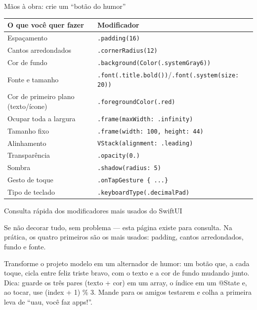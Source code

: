 \begin{tcbpractice}{Mãos à obra: crie um “botão do humor”}

\begin{center}
\begin{tabularx}{\linewidth}{|X|X|}
\hline
\textbf{O que você quer fazer} & \textbf{Modificador} \tabularnewline
\hline
Espaçamento & \texttt{.\allowbreak padding(16)} \tabularnewline
Cantos arredondados & \texttt{.\allowbreak cornerRadius(12)} \tabularnewline
Cor de fundo & \texttt{.\allowbreak background(Color(.\allowbreak systemGray6))} \tabularnewline
Fonte e tamanho & \texttt{.\allowbreak font(.\allowbreak title.\allowbreak bold())}/\texttt{.\allowbreak font(.\allowbreak system(size: 20))} \tabularnewline
Cor de primeiro plano (texto/ícone) & \texttt{.\allowbreak foregroundColor(.\allowbreak red)} \tabularnewline
Ocupar toda a largura & \texttt{.\allowbreak frame(maxWidth: .\allowbreak infinity)} \tabularnewline
Tamanho fixo & \texttt{.\allowbreak frame(width: 100, height: 44)} \tabularnewline
Alinhamento & \texttt{VStack(alignment: .\allowbreak leading)} \tabularnewline
Transparência & \texttt{.\allowbreak opacity(0.\allowbreak 6)} \tabularnewline
Sombra & \texttt{.\allowbreak shadow(radius: 5)} \tabularnewline
Gesto de toque & \texttt{.\allowbreak onTapGesture \{ .\allowbreak .\allowbreak .\allowbreak  \}} \tabularnewline
Tipo de teclado & \texttt{.\allowbreak keyboardType(.\allowbreak decimalPad)} \tabularnewline
\hline
\end{tabularx}
\end{center}

\begin{center}\small\color{gray}Consulta rápida dos modificadores mais usados do SwiftUI\end{center}

Se não decorar tudo, sem problema — esta página existe para consulta. Na prática, os quatro primeiros são os mais usados: padding, cantos arredondados, fundo e fonte.

Transforme o projeto modelo em um alternador de humor: um botão que, a cada toque, cicla entre feliz triste bravo, com o texto e a cor de fundo mudando junto. Dica: guarde os três pares (texto + cor) em um array, o índice em um @State e, ao tocar, use (index + 1) \% 3. Mande para os amigos testarem e colha a primeira leva de “uau, você faz apps!”.

\end{tcbpractice}

